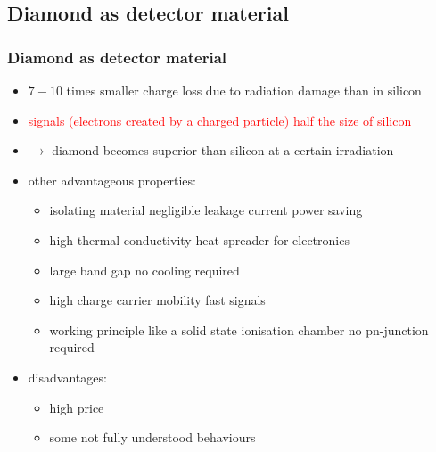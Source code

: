 \subsection{Diamond as detector material}
\begin{frame}
	\frametitle{Diamond as detector material}
	\begin{itemize}
		\setlength{\itemsep}{\fill}
		\item \textcolor{cadmiumgreen}{$7-10$ times smaller charge loss due to radiation damage than in silicon}
		\item \textcolor{red}{signals (electrons created by a charged particle) half the size of silicon}
		\item $\rightarrow$ diamond becomes superior than silicon at a certain irradiation
		\item other advantageous properties:
		\begin{itemize}
			\item isolating material \ra negligible leakage current \ra power saving 
			\item high thermal conductivity \ra heat spreader for electronics
			\item large band gap \ra no cooling required
			\item high charge carrier mobility \ra fast signals
			\item working principle like a solid state ionisation chamber \ra no pn-junction required
		\end{itemize}
		\item disadvantages:
		\begin{itemize}
			\item high price
			\item some not fully understood behaviours 
		\end{itemize}
	\end{itemize}
\end{frame}
